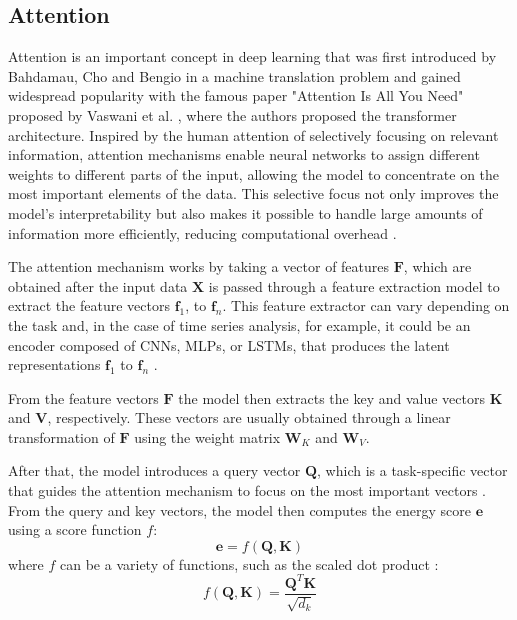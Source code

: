 \subsection{Attention} \label{sec-attention}

Attention is an important concept in deep learning that was first introduced by Bahdamau, Cho and Bengio \cite{bahdanau2016neuralmachinetranslationjointly} in a machine translation problem and gained widespread popularity with the famous paper "Attention Is All You Need" proposed by Vaswani et al. \cite{vaswani2023attentionneed}, where the authors proposed the transformer architecture. Inspired by the human attention of selectively focusing on relevant information, attention mechanisms enable neural networks to assign different weights to different parts of the input, allowing the model to concentrate on the most important elements of the data. This selective focus not only improves the model's interpretability but also makes it possible to handle large amounts of information more efficiently, reducing computational overhead \cite{NIU202148}.

The attention mechanism works by taking a vector of features $\boldsymbol{F}$, which are obtained after the input data $\boldsymbol{X}$ is passed through a feature extraction model to extract the feature vectors $\boldsymbol{f}_1$, to $\boldsymbol{f}_n$. This feature extractor can vary depending on the task and, in the case of time series analysis, for example, it could be an encoder composed of CNNs, MLPs, or LSTMs, that produces the latent representations $\boldsymbol{f}_1$ to $\boldsymbol{f}_n$ \cite{Brauwers_2023}.

From the feature vectors $\boldsymbol{F}$ the model then extracts the key and value vectors $\boldsymbol{K}$ and $\boldsymbol{V}$, respectively. These vectors are usually obtained through a linear transformation of $\boldsymbol{F}$ using the weight matrix $\boldsymbol{W}_K$ and $\boldsymbol{W}_V$.

After that, the model introduces a query vector $\boldsymbol{Q}$, which is a task-specific vector that guides the attention mechanism to focus on the most important vectors \cite{Brauwers_2023,NIU202148}. From the query and key vectors, the model then computes the energy score $\boldsymbol{e}$ using a score function $f$:
\begin{equation}
    \boldsymbol{e} = f\left(\boldsymbol{Q},\boldsymbol{K}\right)
\end{equation}
where $f$ can be a variety of functions, such as the scaled dot product \cite{vaswani2023attentionneed}:
\begin{equation}
    f\left(\boldsymbol{Q},\boldsymbol{K}\right) = \frac{\boldsymbol{Q}^T \boldsymbol{K}}{\sqrt{d_k}}
\end{equation}

